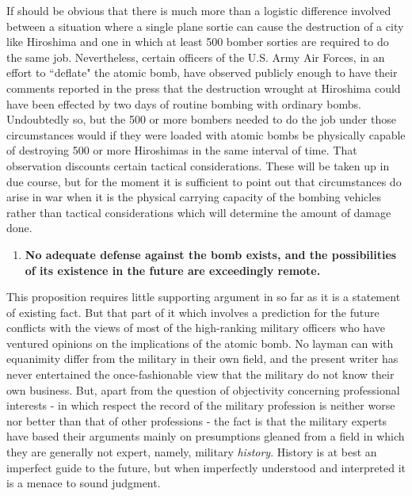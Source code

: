 If should be obvious that there is much more than a logistic difference involved between a situation where a single plane sortie can cause the destruction of a city like Hiroshima and one in which at least 500 bomber sorties are required to do the same job. Nevertheless, certain officers of the U.S. Army Air Forces, in an effort to ``deflate" the atomic bomb, have observed publicly enough to have their comments reported in the press that the destruction wrought at Hiroshima could have been effected by two days of routine bombing with ordinary bombs. Undoubtedly so, but the 500 or more bombers needed to do the job under those circumstances would if they were loaded with atomic bombs be physically capable of destroying 500 or more Hiroshimas in the same interval of time. That observation discounts certain tactical considerations. These will be taken up in due course, but for the moment it is sufficient to point out that circumstances do arise in war when it is the physical carrying capacity of the bombing vehicles rather than tactical considerations which will determine the amount of damage done.

\begin{enumerate}[resume*]

\item \textbf{No adequate defense against the bomb exists, and the possibilities of its existence in the future are exceedingly remote.}

\end{enumerate}

This proposition requires little supporting argument in so far as it is a statement of existing fact. But that part of it which involves a prediction for the future conflicts with the views of most of the high-ranking military officers who have ventured opinions on the implications of the atomic bomb. No layman can with equanimity differ from the military in their own field, and the present writer has never entertained the once-fashionable view that the military do not know their own business. But, apart from the question of objectivity concerning professional interests - in which respect the record of the military profession is neither worse nor better than that of other professions - the fact is that the military experts have based their arguments mainly on presumptions gleaned from a field in which they are generally not expert, namely, military \emph{history}. History is at best an imperfect guide to the future, but when imperfectly understood and interpreted it is a menace to sound judgment.

